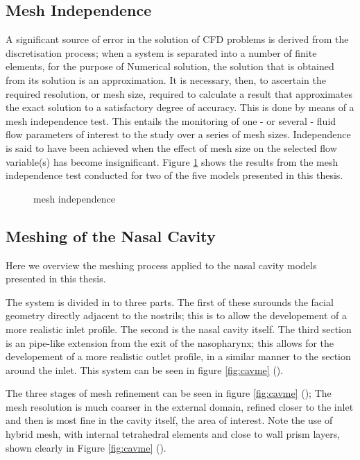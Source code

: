 \subsection{Mesh Independence}

A significant source of error in the solution of CFD problems is derived from the discretisation process; when a system is separated into a number of finite elements, for the purpose of Numerical solution, the solution that is obtained from its solution is an approximation. It is necessary, then, to ascertain the required resolution, or mesh size, required to calculate a result that approximates the exact solution to a satisfactory degree of accuracy. This is done by means of a mesh independence test. This entails the monitoring of one - or several - fluid flow parameters of interest to the study over a series of mesh sizes. Independence is said to have been achieved when the effect of mesh size on the selected flow variable(s) has become insignificant. Figure \ref{fig:mind} shows the results from the mesh independence test conducted for two of the five models presented in this thesis.

\begin{figure}

  \caption{mesh independence} \label{fig:mind}

\end{figure}
\subsection{Meshing of the Nasal Cavity}

Here we overview the meshing process applied to the nasal cavity models presented in this thesis.

The system is divided in to three parts. The first of these surounds the facial geometry directly adjacent to the nostrils; this is to allow the developement of a more realistic inlet profile. The second is the nasal cavity itself. The third section is an pipe-like extension from the exit of the nasopharynx; this allows for the developement of a more realistic outlet profile, in a similar manner to the section around the inlet. This system can be seen in figure \ref{fig:cavme} ().

The three stages of mesh refinement can be seen in figure \ref{fig:cavme} (); The mesh resolution is much coarser in the external domain, refined closer to the inlet and then is most fine in the cavity itself, the area of interest. Note the use of hybrid mesh, with internal tetrahedral elements and close to wall prism layers, shown clearly in Figure \ref{fig:cavme} ().

